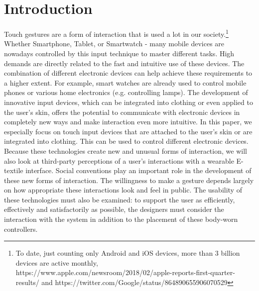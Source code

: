 \documentclass{sigchi}
\begin{document}
\section{Introduction}
%

Touch gestures are a form of interaction that is used a lot in our society.\footnote{To date, just counting only Android and iOS devices, more than 3 billion devices are active monthly, https://www.apple.com/newsroom/2018/02/apple-reports-first-quarter-results/ and https://twitter.com/Google/status/864890655906070529} Whether Smartphone, Tablet, or Smartwatch - many mobile devices are nowadays controlled by this input technique to master different tasks. High demands are directly related to the fast and intuitive use of these devices. The combination of different electronic devices can help achieve these requirements to a higher extent. For example, smart watches are already used to control mobile phones or various home electronics (e.g. controlling lamps). The development of innovative input devices, which can be integrated into clothing or even applied to the user's skin, offers the potential to communicate with electronic devices in completely new ways and make interaction even more intuitive. In this paper, we especially focus on touch input devices that are attached to the user's skin or are integrated into clothing. This can be used to control different electronic devices.
Because these technologies create new and unusual forms of interaction, we will also look at third-party perceptions of a user’s interactions with a wearable E-textile interface. Social conventions play an important role in the development of these new forms of interaction. The willingness to make a gesture depends largely on how appropriate these interactions look and feel in public. \cite{touch-wrist} The usability of these technologies must also be examined: to support the user as efficiently, effectively and satisfactorily as possible, the designers must consider the interaction with the system in addition to the placement of these body-worn controllers.

\end{document}

